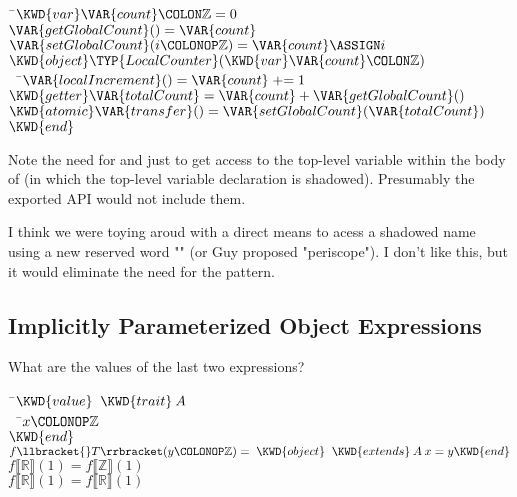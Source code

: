 \begin{Fortress}
{\tt~}\pushtabs\=\+\( \KWD{var} \VAR{count}\COLON \mathbb{Z} = 0\)\\
\( \VAR{getGlobalCount}() = \VAR{count}\)\\
\( \VAR{setGlobalCount}(i\COLONOP\mathbb{Z}) = \VAR{count} \ASSIGN i\)\\[4pt]
\( \KWD{object} \TYP{LocalCounter}(\KWD{var} \VAR{count}\COLON \mathbb{Z})\)\\
{\tt~~}\pushtabs\=\+\(   \VAR{localIncrement}() = \VAR{count} \mathrel{+}= 1\)\\
\(   \KWD{getter} \VAR{totalCount} = \VAR{count} + \VAR{getGlobalCount}()\)\\
\(   \KWD{atomic} \VAR{transfer}() = \VAR{setGlobalCount}(\VAR{totalCount})\)\-\\\poptabs
\( \KWD{end}\)\-\\\poptabs
\end{Fortress}

Note the need for  and  just to get
access to the top-level variable  within the body of
 (in which the top-level  variable declaration
is shadowed).  Presumably the exported API would not include them.

I think we were toying aroud with a direct means to acess a shadowed name
using a new reserved word "" (or Guy proposed "periscope").  I
don't like this, but it would eliminate the need for the pattern.

\subsection{Implicitly Parameterized Object Expressions}

What are the values of the last two expressions?

\begin{Fortress}
{\tt~}\pushtabs\=\+\( \KWD{value}\;\;\KWD{trait}\:A\)\\
{\tt~~}\pushtabs\=\+\(   x\COLONOP\mathbb{Z}\)\-\\\poptabs
\( \KWD{end}\)\\
\( f\llbracket{}T\rrbracket(y\COLONOP\mathbb{Z}) = \;\KWD{object}\;\;\KWD{extends}\:A\:x = y \KWD{end}\)\\
\( f\llbracket\mathbb{R}\rrbracket(1) = f\llbracket\mathbb{Z}\rrbracket(1)\)\\
\( f\llbracket\mathbb{R}\rrbracket(1) = f\llbracket\mathbb{R}\rrbracket(1)\)\-\\\poptabs
\end{Fortress}

